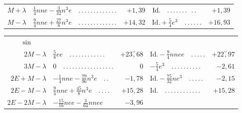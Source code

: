 \begin{landscape}
\begin{longtable}{r|p{7.8cm}r@{\quad}p{4.3cm}r}
\(M+\lambda\)&\(\tfrac14nne-\tfrac{3}{32}n^3e\quad \mathord{.}\,\mathord{.}\,\mathord{.}\,\mathord{.}\,\mathord{.}\,\mathord{.}\,\mathord{.}\,\mathord{.}\,\mathord{.}\,\mathord{.}\,\mathord{.}\,\mathord{.}\,\mathord{.}\)&\(+1{,}39\)
&\(\text{Id.}\quad \mathord{.}\,\mathord{.}\,\mathord{.}\,\mathord{.}\,\mathord{.}\,\mathord{.}\,\mathord{.}\hspace{.65em}\mathord{.}\,\mathord{.}\)&\(+1{,}39\)\\
\(M-\lambda\)&\(\tfrac94nne+\tfrac{27}{8}n^3e\quad \mathord{.}\,\mathord{.}\,\mathord{.}\,\mathord{.}\,\mathord{.}\,\mathord{.}\,\mathord{.}\,\mathord{.}\,\mathord{.}\,\mathord{.}\,\mathord{.}\,\mathord{.}\,\mathord{.}\)&\(+14{,}32\)
&\(\text{Id.}+\tfrac54e^3\quad \mathord{.}\,\mathord{.}\,\mathord{.}\,\mathord{.}\,\mathord{.}\,\mathord{.}\)&\(+16{,}93\)
\end{longtable}
\begin{longtable}{r|p{7.8cm}r@{\quad}p{4.3cm}r}
\multicolumn{1}{c}{\(\sin\)}&&&&\\
\(2M-\lambda\)&\(\tfrac58ee\quad \mathord{.}\,\mathord{.}\,\mathord{.}\,\mathord{.}\,\mathord{.}\,\mathord{.}\,\mathord{.}\,\mathord{.}\,\mathord{.}\,\mathord{.}\,\mathord{.}\,\mathord{.}\)&\(+23\overset{\prime\prime}{,}68\)
&\(\text{Id.}-\tfrac94nnee\quad \mathord{.}\,\mathord{.}\,\mathord{.}\,\mathord{.}\,\mathord{.}\)&\(+22\overset{\prime\prime}{,}97\)\\
\(3M-\lambda\)&\(0\quad \mathord{.}\,\mathord{.}\,\mathord{.}\,\mathord{.}\,\mathord{.}\,\mathord{.}\,\mathord{.}\,\mathord{.}\,\mathord{.}\,\mathord{.}\,\mathord{.}\,\mathord{.}\,\mathord{.}\,\mathord{.}\,\mathord{.}\,\mathord{.}\,\mathord{.}\)&\(0\)
&\(-\tfrac54e^3\quad \mathord{.}\,\mathord{.}\,\mathord{.}\,\mathord{.}\,\mathord{.}\,\mathord{.}\,\mathord{.}\,\mathord{.}\,\mathord{.}\,\mathord{.}\)&\(-2{,}61\)\\
\(2E+M-\lambda\)&\(-\tfrac14nne-\tfrac{79}{96}n^3e\quad \mathord{.}\,\mathord{.}\)&\(-1{,}78\)
&\(\text{Id.}-\tfrac{75}{32}ne^3\quad \mathord{.}\,\mathord{.}\,\mathord{.}\,\mathord{.}\,\mathord{.}\)&\(-2{,}15\)\\
\(2E-M-\lambda\)&\(\tfrac94nne+\tfrac{45}{8}n^3e\quad \mathord{.}\,\mathord{.}\,\mathord{.}\,\mathord{.}\)&\(+15{,}28\)
&\(\text{Id.}\quad \mathord{.}\,\mathord{.}\,\mathord{.}\,\mathord{.}\,\mathord{.}\,\mathord{.}\,\mathord{.}\,\mathord{.}\,\mathord{.}\,\mathord{.}\,\mathord{.}\,\mathord{.}\)&\(+15{,}28\)\\
\(2E-2M-\lambda\)&\(-\tfrac{15}{16}nee-\tfrac{3}{64}nnee\)&\(-3{,}96\)

\end{longtable}
\end{landscape}
